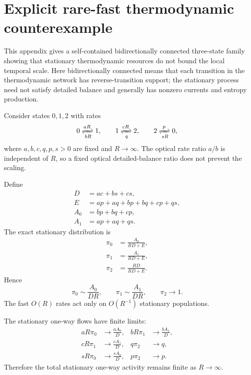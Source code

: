 \section{Explicit rare-fast thermodynamic counterexample}
\label{app:rare-fast}

This appendix gives a self-contained bidirectionally connected three-state family showing that stationary thermodynamic resources do not bound the local temporal scale. Here bidirectionally connected means that each transition in the thermodynamic network has reverse-transition support; the stationary process need not satisfy detailed balance and generally has nonzero currents and entropy production.

Consider states $0,1,2$ with rates
\begin{equation}
0\xrightleftharpoons[bR]{aR}1,
\qquad
1\xrightleftharpoons[q]{cR}2,
\qquad
2\xrightleftharpoons[sR]{p}0,
\label{eq:rareRates}
\end{equation}
where $a,b,c,q,p,s>0$ are fixed and $R\to\infty$.  The optical rate ratio $a/b$ is independent of $R$, so a fixed optical detailed-balance ratio does not prevent the scaling.

Define
\begin{align}
D&=ac+bs+cs,\\
E&=ap+aq+bp+bq+cp+qs,\\
A_0&=bp+bq+cp,\\
A_1&=ap+aq+qs.
\end{align}
The exact stationary distribution is
\begin{align}
\pi_0&=\frac{A_0}{RD+E},\\
\pi_1&=\frac{A_1}{RD+E},\\
\pi_2&=\frac{RD}{RD+E}.
\end{align}
Hence
\begin{equation}
\pi_0\sim\frac{A_0}{DR},
\qquad
\pi_1\sim\frac{A_1}{DR},
\qquad
\pi_2\to1.
\end{equation}
The fast $O(R)$ rates act only on $O(R^{-1})$ stationary populations.

The stationary one-way flows have finite limits:
\begin{align}
aR\pi_0&\to\frac{aA_0}{D}, &
 bR\pi_1&\to\frac{bA_1}{D},\\
cR\pi_1&\to\frac{cA_1}{D}, &
 q\pi_2&\to q,\\
sR\pi_0&\to\frac{sA_0}{D}, &
 p\pi_2&\to p.
\end{align}
Therefore the total stationary one-way activity remains finite as $R\to\infty$.

